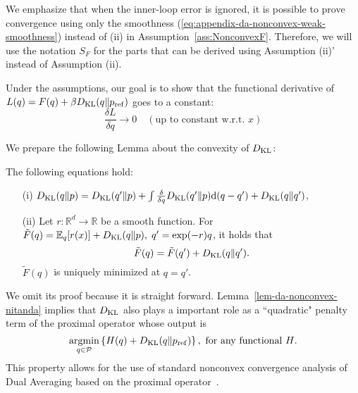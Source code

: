 We emphasize that when the inner-loop error is ignored, it is possible to prove convergence using only the smoothness (\ref{eq:appendix-da-nonconvex-weak-smoothness}) instead of (ii) in Assumption~\ref{ass:NonconvexF}. 
Therefore, we will use the notation $S_F$ for the parts that can be derived using Assumption (ii)' instead of Assumption (ii).

Under the assumptions, our goal is to show that the functional derivative of $L(q)=F(q)+\beta D_{\mathrm{KL}}(q\|p_{\rm{ref}})$ goes to a constant:
\begin{equation}
    \frac{\delta L}{\delta q} \to 0 \quad (\text{up to constant w.r.t. $x$})
\end{equation}

We prepare the following Lemma about the convexity of $D_{\mathrm{KL}}$:
\begin{lem}
    \label{lem-da-nonconvex-nitanda}
    The following equations hold:
    \begin{itemize}
        \item[\textup{(i)}]
        $D_{\mathrm{KL}}(q\|p) = D_{\mathrm{KL}}(q'\|p) + \int \frac{\delta}{\delta q}D_{\mathrm{KL}}(q'\|p) \mathrm{d}(q-q') + D_{\mathrm{KL}}(q\|q')$,
        \item[\textup{(ii)}]
        Let $r: \mathbb{R}^d \to \mathbb{R}$ be a smooth function.
        For $\tilde{F}(q)=\mathbb{E}_q[r(x)] + D_{\mathrm{KL}}(q\|p), \; q' = \exp(-r)q$, it holds that
        \begin{equation}
            \tilde{F}(q)=\tilde{F}(q') + D_{\mathrm{KL}}(q\|q').
        \end{equation}
        $\tilde{F}(q)$ is uniquely minimized at $q=q'$.
    \end{itemize}
\end{lem}
We omit its proof because it is straight forward. 
Lemma~\ref{lem-da-nonconvex-nitanda} implies that $D_{\mathrm{KL}}$ also plays a important role as a ``quadratic" penalty term of the proximal operator whose output is 
\begin{equation}
    \underset{q\in {\mathcal{P}}}{\mathrm{argmin}} \left\lbrace H(q) + D_{\mathrm{KL}}(q\|p_{\rm{ref}}) \right\rbrace, \text{  for any functional $H$}.
\end{equation}
This property allows for the use of standard nonconvex convergence analysis of Dual Averaging based on the proximal operator~\citep{LIU2023nonconvexDA}.

